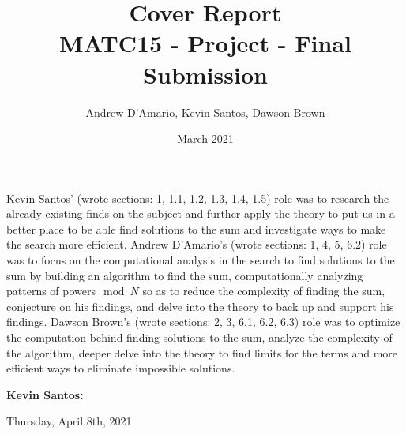 \documentclass{article}
\title{Cover Report \\ \vspace{.3in} \large{MATC15 - Project - Final Submission}}
\author{Andrew D'Amario, Kevin Santos, Dawson Brown}
\date{March 2021}
\begin{document}
\maketitle

\begin{flushleft}



Kevin Santos' (wrote sections: 1, 1.1, 1.2, 1.3, 1.4, 1.5) role was to research the already existing finds on the subject and further apply the theory to put us in a better place to be able find solutions to the sum and investigate ways to make the search more efficient.
Andrew D'Amario's (wrote sections: 1, 4, 5, 6.2) role was to focus on the computational analysis in the search to find solutions to the sum by building an algorithm to find the sum, computationally analyzing patterns of powers$\mod N$ so as to reduce the complexity of finding the sum, conjecture on his findings, and delve into the theory to back up and support his findings.
Dawson Brown's (wrote sections: 2, 3, 6.1, 6.2, 6.3) role was to optimize the computation behind finding solutions to the sum, analyze the complexity of the algorithm, deeper delve into the theory to find limits for the terms and more efficient ways to eliminate impossible solutions.

\vspace{.5in}

{\bf Kevin Santos:}
\hspace{.63in}{\bf Dawson Brown:}
\hspace{.63in}{\bf Andrew D'Amario: }  


\vspace{1in}


Thursday, April 8th, 2021

\end{flushleft}
\end{document}

